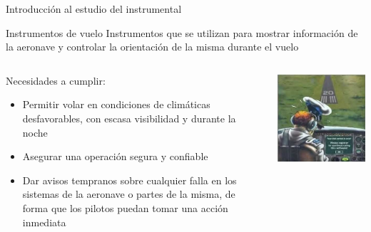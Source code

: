 \documentclass[10pt]{beamer}
\begin{document}
\begin{frame}{Introducci\'on al estudio del instrumental}

  \begin{block}{Instrumentos de vuelo}
    Instrumentos que se utilizan para mostrar informaci\'on de la
    aeronave y controlar la orientaci\'on de la misma durante el vuelo
  \end{block}

  \begin{columns}{2}

    \begin{column}{0.5\textwidth}
{\small
  \begin{block}{    Necesidades a cumplir:}
    \begin{itemize}
    \item Permitir volar en condiciones de clim\'aticas desfavorables, 
	con escasa visibilidad y durante la noche
    \item Asegurar una operaci\'on segura y confiable
    \item Dar avisos tempranos sobre cualquier falla en los sistemas
      de la aeronave o partes de la misma, de forma que los pilotos
      puedan tomar una acci\'on inmediata
    \end{itemize}
  \end{block}
}
\end{column}
    \begin{column}{0.5\textwidth}
 \includegraphics[width=\linewidth]{imagenes/1.1.introduccion/problema_soft.jpg} \\
    \end{column}
  \end{columns}

\end{frame}
\end{document}
